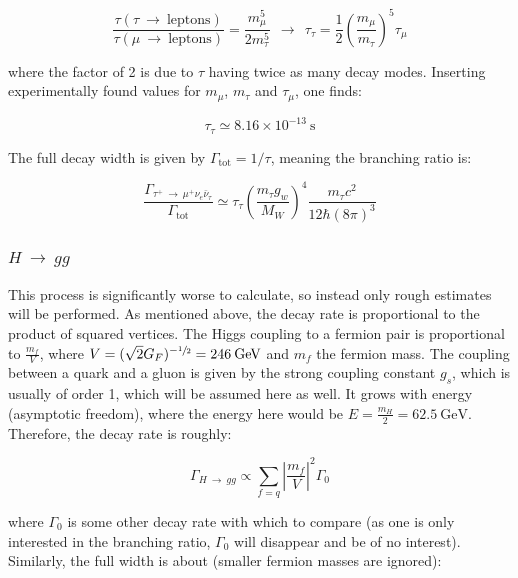 \documentclass[11pt,a4paper]{article}
\begin{document}
\begin{equation}
	\frac{\tau(\tau\:\rightarrow\:\text{leptons})}{\tau(\mu\:\rightarrow\:\text{leptons})} = \frac{m_\mu^5}{2m_\tau^5} \:\:\longrightarrow\:\: \tau_\tau = \frac{1}{2}\left(\frac{m_\mu}{m_\tau}\right)^5\tau_\mu
\end{equation}

where the factor of 2 is due to $\tau$ having twice as many decay modes. Inserting experimentally found values for $m_\mu$, $m_\tau$ and $\tau_\mu$, one finds:

\begin{equation}
	\tau_\tau \simeq 8.16\times 10^{-13}\:\text{s}
\end{equation}

The full decay width is given by $\Gamma_{\text{tot}} = 1/\tau$, meaning the branching ratio is:

\begin{equation}
	\frac{\Gamma_{\tau^+ \:\rightarrow\: \mu^+\nu_e\bar{\nu}_\tau}}{\Gamma_{\text{tot}}} \simeq \tau_\tau\left(\frac{m_\tau g_w}{M_W}\right)^4 \frac{m_\tau c^2}{12\hbar(8\pi)^3}
\end{equation}

\subsubsection{$H \:\rightarrow\: gg$}
This process is significantly worse to calculate, so instead only rough estimates will be performed. As mentioned above, the decay rate is proportional to the product of squared vertices. The Higgs coupling to a fermion pair is proportional to $\frac{m_f}{V}$, where $V=(\sqrt{2}G_F)^{-\sfrac{1}{2}} = 246\:\text{GeV}$ and $m_f$ the fermion mass. The coupling between a quark and a gluon is given by the strong coupling constant $g_s$, which is usually of order 1, which will be assumed here as well. It grows with energy (asymptotic freedom), where the energy here would be $E = \frac{m_H}{2} = 62.5\:\text{GeV}$. Therefore, the decay rate is roughly:

\begin{equation}
	\Gamma_{H \:\rightarrow\: gg} \propto \sum_{f=q}\left|\frac{m_f}{V}\right|^2\Gamma_0
\end{equation}

where $\Gamma_0$ is some other decay rate with which to compare (as one is only interested in the branching ratio, $\Gamma_0$ will disappear and be of no interest). Similarly, the full width is about (smaller fermion masses are ignored):
\end{document}
